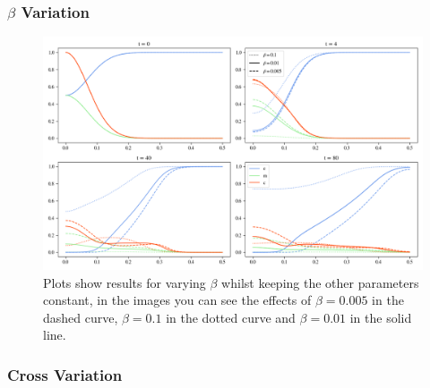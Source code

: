 \subsubsection*{$\beta$ Variation}
\begin{figure}[h]
    \centering
    \includegraphics[width=\textwidth]{resources/images/prolif_beta_variation.png}
    \caption{Plots show results for varying $\beta$ whilst keeping the other parameters constant, in the images you can see the effects of $\beta=0.005$ in the dashed curve, $\beta=0.1$ in the dotted curve and $\beta=0.01$ in the solid line.}
    \label{fig:beta_variation}
\end{figure}

\subsubsection*{Cross Variation}

